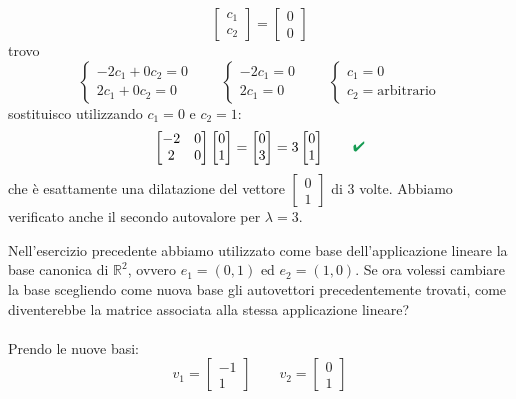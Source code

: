 \documentclass[italian]{article}
\renewcommand{\checkmark}{\textcolor{ForestGreen}{\text{$\qquad$\ding{52}}}}
\newcommand{\ins}[1]{\text{$\mathbb{#1}$}}
\begin{document}
\begin{itemize}
\[			\begin{bmatrix}c_1\\c_2\end{bmatrix}
			=
			\begin{bmatrix}0\\0\end{bmatrix}
		\]
		trovo
		\[
			\begin{cases*}
				-2c_1 + 0c_2 = 0 \\
				2c_1 + 0c_2 = 0
			\end{cases*}
			\qquad
			\begin{cases*}
				-2c_1 = 0 \\
				2c_1 = 0
			\end{cases*}
			\qquad
			\begin{cases*}
				c_1 = 0\\
				c_2 = \text{arbitrario}
			\end{cases*}
		\]
		sostituisco utilizzando $c_1 =0$ e $c_2 = 1$:
		\[
			\begin{bmatrix}-2 & 0 \\ 2 & 0\end{bmatrix}
			\begin{bmatrix}0\\1\end{bmatrix}
			=
			\begin{bmatrix}0\\3\end{bmatrix}
			=
			3\begin{bmatrix}0\\1\end{bmatrix}
			\checkmark
		\]
		che è esattamente una dilatazione del vettore $\begin{bmatrix}0\\1\end{bmatrix}$ di 3 volte. Abbiamo verificato anche il secondo autovalore per $\lambda = 3$.
\end{itemize}
Nell'esercizio precedente abbiamo utilizzato come base dell'applicazione lineare la base canonica di $\ins{R}^2$, ovvero $e_1=(0,1)$ ed $e_2=(1,0)$. Se ora volessi cambiare la base scegliendo come nuova base gli autovettori precedentemente trovati, come diventerebbe la matrice associata alla stessa applicazione lineare?\\\\
Prendo le nuove basi:
\[
	v_1 = \begin{bmatrix}-1\\1\end{bmatrix} \qquad
	v_2 = \begin{bmatrix}0\\1\end{bmatrix}
\]
\end{document}
